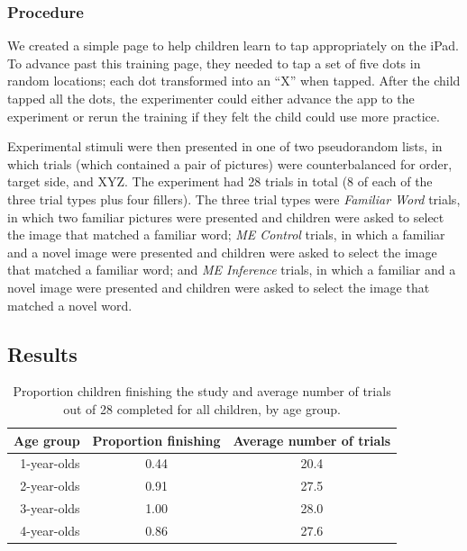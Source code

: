 \documentclass[man,noapacite]{apa2}
\begin{document}
\subsubsection{Procedure}

We created a simple page to help children learn to tap appropriately on the iPad. To advance past this training page, they needed to tap a set of five dots in random locations; each dot transformed into an ``X'' when tapped. After the child tapped all the dots, the experimenter could either advance the app to the experiment or rerun the training if they felt the child could use more practice. 

Experimental stimuli were then presented in one of two pseudorandom lists, in which trials (which contained a pair of pictures) were counterbalanced for order, target side, and XYZ. The experiment had 28 trials in total (8 of each of the three trial types plus four fillers). The three trial types were \emph{Familiar Word} trials, in which two familiar pictures were presented and children were asked to select the image that matched a familiar word; \emph{ME Control} trials, in which a familiar and a novel image were presented and children were asked to select the image that matched a familiar word; and \emph{ME Inference} trials, in which a familiar and a novel image were presented and children were asked to select the image that matched a novel word. 

\subsection{Results}


\begin{table}[t]
\centering
\caption{Proportion children finishing the study and average number of trials out of 28 completed for all children, by age group.\label{tab:completion}}

\begin{tabular}{rcc}
  \hline
Age group & Proportion finishing & Average number of trials \\ 
  \hline
1-year-olds & 0.44 & 20.4 \\ 
2-year-olds & 0.91 & 27.5 \\ 
3-year-olds & 1.00 & 28.0 \\ 
4-year-olds & 0.86 & 27.6 \\ 
   \hline
\end{tabular}
\end{table}
\end{document}
